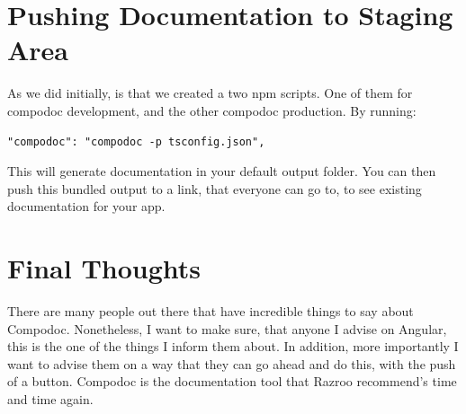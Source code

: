 \section{Pushing Documentation to Staging Area }
As we did initially, is that we created a two npm scripts. One of them for compodoc development, and the other compodoc production. By running: 
\begin{lstlisting}
"compodoc": "compodoc -p tsconfig.json",
\end{lstlisting}

This will generate documentation in your default output folder. You can then push this bundled output to a link, that everyone can go to, to see existing documentation for your app. 

\section{Final Thoughts}
There are many people out there that have incredible things to say about Compodoc. Nonetheless, I want to make sure, that anyone I advise on Angular, this is the one of the things I inform them about. In addition, more importantly I want to advise them on a way that they can go ahead and do this, with the push of a button. Compodoc is the documentation tool that Razroo recommend's time and time again.